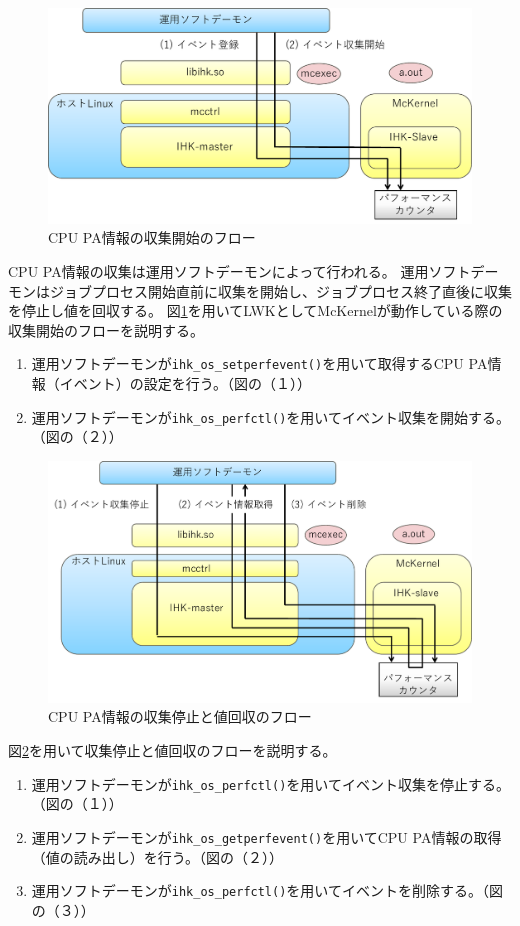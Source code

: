 \documentclass[twoside,11pt,fleqn]{book}
\begin{document}
\begin{figure}[!htb]
\centering
\includegraphics[width=12cm]{figs/cpupa_sow.pdf}
\vspace{-0em}\caption{CPU PA情報の収集開始のフロー}
\label{fig:cpupa_sow}
\vspace{-0em}
\end{figure}
%
\FloatBarrier
%
CPU PA情報の収集は運用ソフトデーモンによって行われる。
運用ソフトデーモンはジョブプロセス開始直前に収集を開始し、ジョブプロセス終了直後に収集を停止し値を回収する。
図\ref{fig:cpupa_sow}を用いてLWKとしてMcKernelが動作している際の収集開始のフローを説明する。
\begin{enumerate}
\item 運用ソフトデーモンが\texttt{ihk\_os\_setperfevent()}を用いて取得するCPU PA情報（イベント）の設定を行う。（図の（１））
\item 運用ソフトデーモンが\texttt{ihk\_os\_perfctl()}を用いてイベント収集を開始する。（図の（２））
\end{enumerate}

\begin{figure}[!htb]
\centering
\includegraphics[width=12cm]{figs/cpupa_reap.pdf}
\vspace{-0em}\caption{CPU PA情報の収集停止と値回収のフロー}
\label{fig:cpupa_reap}
\vspace{-0em}
\end{figure}
%
\FloatBarrier
%
図\ref{fig:cpupa_reap}を用いて収集停止と値回収のフローを説明する。
\begin{enumerate}
\item 運用ソフトデーモンが\texttt{ihk\_os\_perfctl()}を用いてイベント収集を停止する。（図の（１））
\item 運用ソフトデーモンが\texttt{ihk\_os\_getperfevent()}を用いてCPU PA情報の取得（値の読み出し）を行う。（図の（２））
\item 運用ソフトデーモンが\texttt{ihk\_os\_perfctl()}を用いてイベントを削除する。（図の（３））
\end{enumerate}
\end{document}
